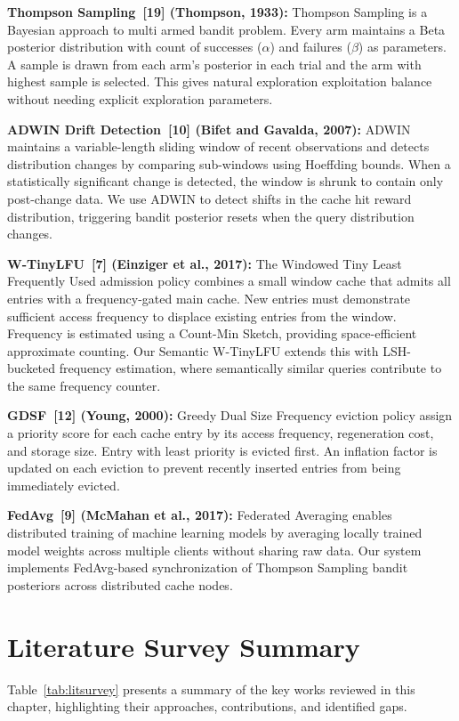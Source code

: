 \documentclass[12pt,a4paper]{report}
\begin{document}
\textbf{Thompson Sampling~[19] (Thompson, 1933):} Thompson Sampling is a Bayesian approach to multi armed bandit problem. Every arm maintains a Beta posterior distribution with count of successes ($\alpha$) and failures ($\beta$) as parameters. A sample is drawn from each arm's posterior in each trial and the arm with highest sample is selected. This gives natural exploration exploitation balance without needing explicit exploration parameters.

\textbf{ADWIN Drift Detection~[10] (Bifet and Gavalda, 2007):} ADWIN maintains a variable-length sliding window of recent observations and detects distribution changes by comparing sub-windows using Hoeffding bounds. When a statistically significant change is detected, the window is shrunk to contain only post-change data. We use ADWIN to detect shifts in the cache hit reward distribution, triggering bandit posterior resets when the query distribution changes.

\textbf{W-TinyLFU~[7] (Einziger et al., 2017):} The Windowed Tiny Least Frequently Used admission policy combines a small window cache that admits all entries with a frequency-gated main cache. New entries must demonstrate sufficient access frequency to displace existing entries from the window. Frequency is estimated using a Count-Min Sketch, providing space-efficient approximate counting. Our Semantic W-TinyLFU extends this with LSH-bucketed frequency estimation, where semantically similar queries contribute to the same frequency counter.

\textbf{GDSF~[12] (Young, 2000):} Greedy Dual Size Frequency eviction policy assign a priority score for each cache entry by its access frequency, regeneration cost, and storage size. Entry with least priority is evicted first. An inflation factor is updated on each eviction to prevent recently inserted entries from being immediately evicted.

\textbf{FedAvg~[9] (McMahan et al., 2017):} Federated Averaging enables distributed training of machine learning models by averaging locally trained model weights across multiple clients without sharing raw data. Our system implements FedAvg-based synchronization of Thompson Sampling bandit posteriors across distributed cache nodes.

\section{Literature Survey Summary}

Table~\ref{tab:litsurvey} presents a summary of the key works reviewed in this chapter, highlighting their approaches, contributions, and identified gaps.
\end{document}
